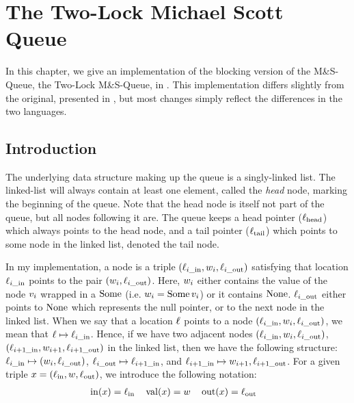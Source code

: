\documentclass[a4paper, 10pt]{report}
\theoremstyle{definition}
\newcommand{\msq}{M\&S-Queue\xspace}
\newcommand{\tlmsq}{Two-Lock \msq}
\newcommand{\locin}{\loc_{\mathrm{in}}}
\newcommand{\locinM}[1]{\loc_{#1\_\mathrm{in}}}
\newcommand{\locout}{\loc_{\mathrm{out}}}
\newcommand{\locoutM}[1]{\loc_{#1\_\mathrm{out}}}
\newcommand{\locN}[1]{\loc_{\mathrm{#1}}}
\newcommand{\lochead}{\locN{head}}
\newcommand{\loctail}{\locN{tail}}
\newcommand{\nodeval}{\valB}
\newcommand{\nodevalM}[1]{\nodeval_{#1}}
\newcommand{\nIn}[1]{\operatorname{in}(#1)}
\newcommand{\nVal}[1]{\operatorname{val}(#1)}
\newcommand{\nOut}[1]{\operatorname{out}(#1)}
\newcommand{\node}{x}
\newcommand{\absvalue}{\val}
\begin{document}
\chapter{The Two-Lock Michael Scott Queue}
\label{ch:TLMSQ}

In this chapter, we give an implementation of the blocking version of the \msq, the \tlmsq, in \heaplang. This implementation differs slightly from the original, presented in \cite{DBLP:conf/podc/MichaelS96}, but most changes simply reflect the differences in the two languages.


\section{Introduction}
\label{TLMSQ:section:introduction}

The underlying data structure making up the queue is a singly-linked list. The linked-list will always contain at least one element, called the \emph{head} node, marking the beginning of the queue. Note that the head node is itself not part of the queue, but all nodes following it are. The queue keeps a head pointer ($\lochead$) which always points to the head node, and a tail pointer ($\loctail$) which points to some node in the linked list, denoted the tail node.

In my implementation, a node is a triple $(\locinM{i}, \nodevalM{i}, \locoutM{i})$ satisfying that location $\locinM{i}$ points to the pair $(\nodevalM{i}, \locoutM{i})$. Here, $\nodevalM{i}$ either contains the value of the node $\absvalue_i$ wrapped in a $\operatorname{Some}$ (i.e. $\nodevalM{i} = \Some \absvalue_i$) or it contains $\operatorname{None}$. $\locoutM{i}$ either points to $\operatorname{None}$ which represents the null pointer, or to the next node in the linked list. When we say that a location $\ell$ points to a node $(\locinM{i}, \nodevalM{i}, \locoutM{i})$, we mean that $\loc \mapsto \locinM{i}$. Hence, if we have two adjacent nodes $(\locinM{i}, \nodevalM{i}, \locoutM{i})$, $(\locinM{i+1}, \nodevalM{i+1}, \locoutM{i+1})$ in the linked list, then we have the following structure: $\locinM{i} \mapsto (\nodevalM{i}, \locoutM{i})$, $\locoutM{i} \mapsto \locinM{i+1}$, and $\locinM{i+1} \mapsto \nodevalM{i+1}, \locoutM{i+1}$.
For a given triple $\node = (\locin, \nodeval, \locout)$, we introduce the following notation:
\begin{align*}
  &\nIn{\node} = \locin& &\nVal{\node} = \nodeval& &\nOut{\node} = \locout
\end{align*}
\end{document}
